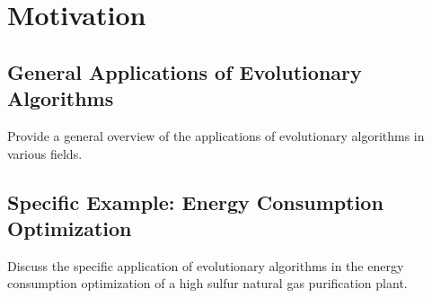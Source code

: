 \section{Motivation}
\subsection{General Applications of Evolutionary Algorithms}
Provide a general overview of the applications of evolutionary algorithms in various fields.

\subsection{Specific Example: Energy Consumption Optimization}
Discuss the specific application of evolutionary algorithms in the energy consumption optimization of a high sulfur natural gas purification plant.

